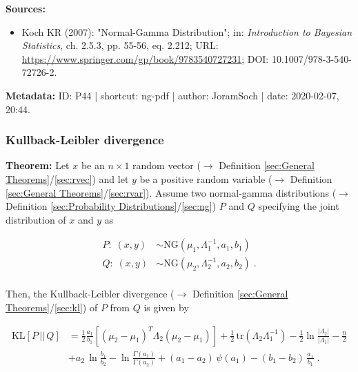 \documentclass[a4paper,12pt,twoside]{book}
\begin{document}
\vspace{1em}
\textbf{Sources:}
\begin{itemize}
\item Koch KR (2007): "Normal-Gamma Distribution"; in: \textit{Introduction to Bayesian Statistics}, ch. 2.5.3, pp. 55-56, eq. 2.212; URL: \url{https://www.springer.com/gp/book/9783540727231}; DOI: 10.1007/978-3-540-72726-2.
\end{itemize}


\vspace{1em}
\textbf{Metadata:} ID: P44 | shortcut: ng-pdf | author: JoramSoch | date: 2020-02-07, 20:44.
\vspace{1em}



\subsubsection[\textbf{Kullback-Leibler divergence}]{Kullback-Leibler divergence} \label{sec:ng-kl}
\setcounter{equation}{0}

\textbf{Theorem:} Let $x$ be an $n \times 1$ random vector ($\rightarrow$ Definition \ref{sec:General Theorems}/\ref{sec:rvec}) and let $y$ be a positive random variable ($\rightarrow$ Definition \ref{sec:General Theorems}/\ref{sec:rvar}). Assume two normal-gamma distributions ($\rightarrow$ Definition \ref{sec:Probability Distributions}/\ref{sec:ng}) $P$ and $Q$ specifying the joint distribution of $x$ and $y$ as

\begin{equation} \label{eq:ng-kl-NGs}
\begin{split}
P: \; (x,y) &\sim \mathrm{NG}(\mu_1, \Lambda_1^{-1}, a_1, b_1) \\
Q: \; (x,y) &\sim \mathrm{NG}(\mu_2, \Lambda_2^{-1}, a_2, b_2) \; . \\
\end{split}
\end{equation}

Then, the Kullback-Leibler divergence ($\rightarrow$ Definition \ref{sec:General Theorems}/\ref{sec:kl}) of $P$ from $Q$ is given by

\begin{equation} \label{eq:ng-kl-NG-KL}
\begin{split}
\mathrm{KL}[P\,||\,Q] &= \frac{1}{2} \frac{a_1}{b_1} \left[ (\mu_2 - \mu_1)^T \Lambda_2 (\mu_2 - \mu_1) \right] + \frac{1}{2} \, \mathrm{tr}(\Lambda_2 \Lambda_1^{-1}) - \frac{1}{2} \ln \frac{|\Lambda_2|}{|\Lambda_1|} - \frac{n}{2} \\
&+ a_2 \, \ln \frac{b_1}{b_2} - \ln \frac{\Gamma(a_1)}{\Gamma(a_2)} + (a_1 - a_2) \, \psi(a_1) - (b_1 - b_2) \, \frac{a_1}{b_1} \; .
\end{split}
\end{equation}
\end{document}
